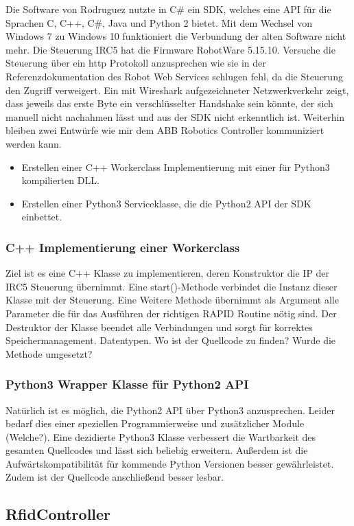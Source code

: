 Die Software von Rodruguez nutzte in C\# ein SDK, welches eine API für die Sprachen C, C++, C\#, Java und Python 2 bietet. 
Mit dem Wechsel von Windows 7 zu Windows 10 funktioniert die Verbundung der alten Software nicht mehr. Die Steuerung IRC5 hat die Firmware RobotWare 5.15.10. 
Versuche die Steuerung über ein http Protokoll anzusprechen wie sie in der Referenzdokumentation des Robot Web Services \cite{RWS} schlugen fehl, da die Steuerung den Zugriff verweigert. 
Ein mit Wireshark aufgezeichneter Netzwerkverkehr zeigt, dass jeweils das erste Byte ein verschlüsselter Handshake sein könnte, der sich manuell nicht nachahmen lässt und aus der SDK nicht erkenntlich ist. 
Weiterhin bleiben zwei Entwürfe wie mir dem ABB Robotics Controller kommuniziert werden kann. 
\begin{itemize}
    \item Erstellen einer C++ Workerclass Implementierung mit einer für Python3 kompilierten DLL. 
    \item Erstellen einer Python3 Serviceklasse, die die Python2 API der SDK einbettet.
\end{itemize}
\subsubsection*{C++ Implementierung einer Workerclass}
Ziel ist es eine C++ Klasse zu implementieren, deren Konstruktor die IP der IRC5 Steuerung übernimmt.
Eine start()-Methode verbindet die Instanz dieser Klasse mit der Steuerung. 
Eine Weitere Methode übernimmt als Argument alle Parameter die für das Ausführen der richtigen RAPID Routine nötig sind. 
Der Destruktor der Klasse beendet alle Verbindungen und sorgt für korrektes Speichermanagement. 
Datentypen. 
Wo ist der Quellcode zu finden?
Wurde die Methode umgesetzt?

\subsubsection{Python3 Wrapper Klasse für Python2 API}

Natürlich ist es möglich, die Python2 API über Python3 anzusprechen. Leider bedarf dies einer speziellen Programmierweise und zusätzlicher Module (Welche?).
Eine dezidierte Python3 Klasse verbessert die Wartbarkeit des gesamten Quellcodes und lässt sich beliebig erweitern. 
Außerdem ist die Aufwärtskompatibilität für kommende Python Versionen besser gewährleistet. Zudem ist der Quellcode anschließend besser lesbar. 


\subsection{RfidController}

